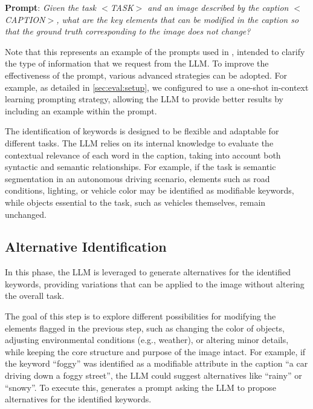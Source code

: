 \begin{tcolorbox}[arc=.3em,left=.3em,right=.3em,top=.3em,bottom=.3em]
\begin{center}
\begin{minipage}[t]{.99\linewidth}
\textbf{Prompt}: \textit{
Given the task $<$TASK$>$ and an image described by the caption $<$CAPTION$>$, what are the key elements that can be modified in the caption so that the ground truth corresponding to the image does not change?
}
\end{minipage}
\end{center}
\end{tcolorbox}

Note that this represents an example of the prompts used in \approach, intended to clarify the type of information that we request from the LLM. To improve the effectiveness of the prompt, various advanced strategies can be adopted. For example, as detailed in \autoref{sec:eval:setup}, we configured \approach to use a one-shot in-context learning prompting strategy, allowing the LLM to provide better results by including an example within the prompt.

The identification of keywords is designed to be flexible and adaptable for different tasks. The LLM relies on its internal knowledge to evaluate the contextual relevance of each word in the caption, taking into account both syntactic and semantic relationships. For example, if the task is semantic segmentation in an autonomous driving scenario, elements such as road conditions, lighting, or vehicle color may be identified as modifiable keywords, while objects essential to the task, such as vehicles themselves, remain unchanged.

\subsection{Alternative Identification}

In this phase, the LLM is leveraged to generate alternatives for the identified keywords, providing variations that can be applied to the image without altering the overall task.

The goal of this step is to explore different possibilities for modifying the elements flagged in the previous step, such as changing the color of objects, adjusting environmental conditions (e.g., weather), or altering minor details, while keeping the core structure and purpose of the image intact. For example, if the keyword ``foggy'' was identified as a modifiable attribute in the caption ``a car driving down a foggy street'', the LLM could suggest alternatives like ``rainy'' or ``snowy''.
To execute this, \approach generates a prompt asking the LLM to propose alternatives for the identified keywords. 


